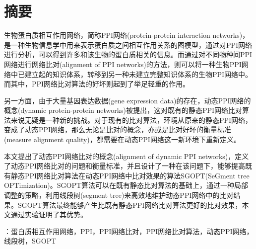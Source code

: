 \chapter*{摘要}
生物蛋白质相互作用网络，简称PPI网络(protein-protein interaction networks)，是一种生物信息学中用来表示蛋白质之间相互作用关系的图模型，通过对PPI网络进行分析，可以得到许多和该生物的蛋白质相关的信息。而通过对不同物种间PPI网络进行网络比对(alignment of PPI networks)的方法，则可以将一种生物PPI网络中已建立起的知识体系，转移到另一种未建立完整知识体系的生物PPI网络中。而其中，PPI网络比对算法的好坏则起到了举足轻重的作用。

另一方面，由于大量基因表达数据(gene expression data)的存在，动态PPI网络的概念(dynamic protein-protein networks)被提出，这对既有的静态PPI网络比对算法来说无疑是一种新的挑战。对于现有的比对算法，环境从原来的静态PPI网络，变成了动态PPI网络，那么无论是比对的概念，亦或是比对好坏的衡量标准(measure alignment quality)，都需要在动态PPI网络这一新环境下重新定义。

本文提出了动态PPI网络比对的概念(alignment of dynamic PPI networks)，定义了动态PPI网络比对的问题和衡量标准，并且设计了一种在该问题下，能够提高既有静态PPI网络比对算法在动态PPI网络中比对效果的算法SGOPT(SeGment tree OPTimization)。SGOPT算法可以在既有静态比对算法的基础上，通过一种局部调整的策略，利用线段树(segment tree)来高效地维护动态PPI网络中的比对结果。SGOPT算法最终能够产生比既有静态PPI网络比对算法更好的比对效果，本文通过实验证明了其优势。


：蛋白质相互作用网络，PPI，PPI网络比对，PPI网络比对算法，动态PPI网络，线段树，SGOPT

